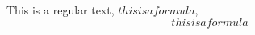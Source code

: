\documentclass[preview]{standalone}
\begin{document}
\begin{center}
This is a regular text,
            $this is a formula$,
            $$this is a formula$$
\end{center}
\end{document}
